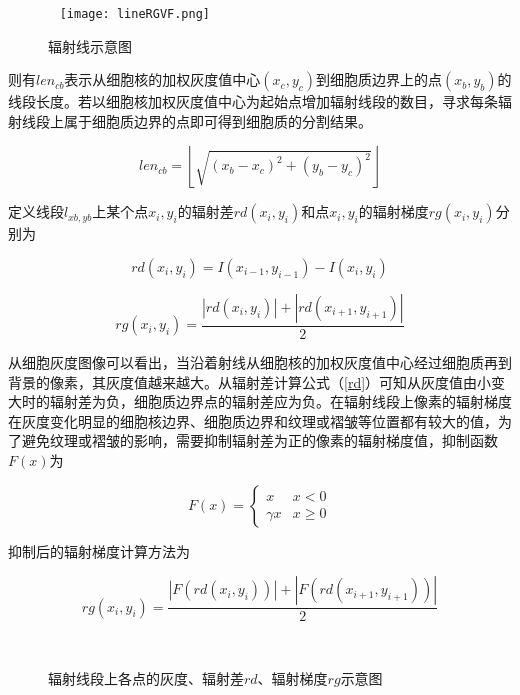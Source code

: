 \documentclass[nomlist,masters]{seuthesix}
\begin{document}
\begin{figure}[H]
\centering 
\texttt{[image: lineRGVF.png]}
\caption{辐射线示意图}
\label{RGVFpLine}
\end{figure}

则有$len_{cb}$表示从细胞核的加权灰度值中心$(x_{c},y_{c})$到细胞质边界上的点$(x_{b},y_{b})$的线段长度。若以细胞核加权灰度值中心为起始点增加辐射线段的数目，寻求每条辐射线段上属于细胞质边界的点即可得到细胞质的分割结果。

\begin{equation}
len_{cb}=\left \lfloor \sqrt{(x_{b}-x_{c})^{2}+(y_{b}-y_{c})^{2}} \right \rfloor
\label{lenb}
\end{equation}

定义线段$l_{xb,yb}$上某个点$x_{i},y_{i}$的辐射差$rd(x_{i},y_{i})$和点$x_{i},y_{i}$的辐射梯度$rg(x_{i},y_{i})$分别为

\begin{equation}
rd(x_{i},y_{i})=I(x_{i-1},y_{i-1})-I(x_{i},y_{i})
\label{rd}
\end{equation}

\begin{equation}
rg(x_{i},y_{i})=\frac{\left |rd(x_{i},y_{i})\right |+\left |rd(x_{i+1},y_{i+1}) \right |}{2}
\label{rg0}
\end{equation}

从细胞灰度图像可以看出，当沿着射线从细胞核的加权灰度值中心经过细胞质再到背景的像素，其灰度值越来越大。从辐射差计算公式（\ref{rd}）可知从灰度值由小变大时的辐射差为负，细胞质边界点的辐射差应为负。在辐射线段上像素的辐射梯度在灰度变化明显的细胞核边界、细胞质边界和纹理或褶皱等位置都有较大的值，为了避免纹理或褶皱的影响，需要抑制辐射差为正的像素的辐射梯度值，抑制函数$F(x)$为

\begin{equation}
F(x)=\left\{\begin{matrix}
x &x< 0 \\ 
\gamma x & x\geq 0
\end{matrix}\right.
\label{Fx}
\end{equation}

抑制后的辐射梯度计算方法为

\begin{equation}
rg(x_{i},y_{i})=\frac{\left |F(rd(x_{i},y_{i}))\right |+\left |F(rd(x_{i+1},y_{i+1})) \right |}{2}
\label{rg}
\end{equation}

\begin{figure}[H]
\centering 
\hspace{0.001\textwidth}
\vfill
\centering 
\hspace{0.001\textwidth}
\caption{辐射线段上各点的灰度、辐射差$rd$、辐射梯度$rg$示意图}
\label{RGVFp2}
\end{figure}
\end{document}
